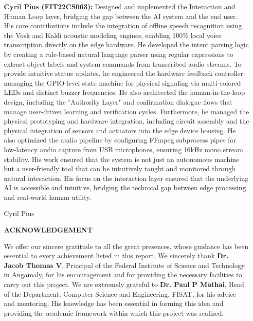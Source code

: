 \documentclass[12pt,a4paper]{report}
\begin{document}
\noindent
\textbf{Cyril Pius (FIT22CS063):} Designed and implemented the Interaction and Human Loop layer, bridging the gap between the AI system and the end user. His core contributions include the integration of offline speech recognition using the Vosk and Kaldi acoustic modeling engines, enabling 100\% local voice transcription directly on the edge hardware. He developed the intent parsing logic by creating a rule-based natural language parser using regular expressions to extract object labels and system commands from transcribed audio streams. To provide intuitive status updates, he engineered the hardware feedback controller managing the GPIO-level state machine for physical signaling via multi-colored LEDs and distinct buzzer frequencies. He also architected the human-in-the-loop design, including the "Authority Layer" and confirmation dialogue flows that manage user-driven learning and verification cycles. Furthermore, he managed the physical prototyping and hardware integration, including circuit assembly and the physical integration of sensors and actuators into the edge device housing. He also optimized the audio pipeline by configuring FFmpeg subprocess pipes for low-latency audio capture from USB microphones, ensuring 16kHz mono stream stability. His work ensured that the system is not just an autonomous machine but a user-friendly tool that can be intuitively taught and monitored through natural interaction. His focus on the interaction layer ensured that the underlying AI is accessible and intuitive, bridging the technical gap between edge processing and real-world human utility.

\vspace{3cm}
\begin{flushright}
    Cyril Pius
\end{flushright}
\newpage
\begin{center}
    \textbf{\Large ACKNOWLEDGEMENT}
\end{center}

\vspace{1cm}
\noindent
We offer our sincere gratitude to all the great presences, whose guidance has been essential to every achievement listed in this report. We sincerely thank \textbf{Dr. Jacob Thomas V}, Principal of the Federal Institute of Science and Technology in Angamaly, for his encouragement and for providing the necessary facilities to carry out this project. We are extremely grateful to \textbf{Dr. Paul P Mathai}, Head of the Department, Computer Science and Engineering, FISAT, for his advice and mentoring. His knowledge has been essential in forming this idea and providing the academic framework within which this project was realized. 
\end{document}
